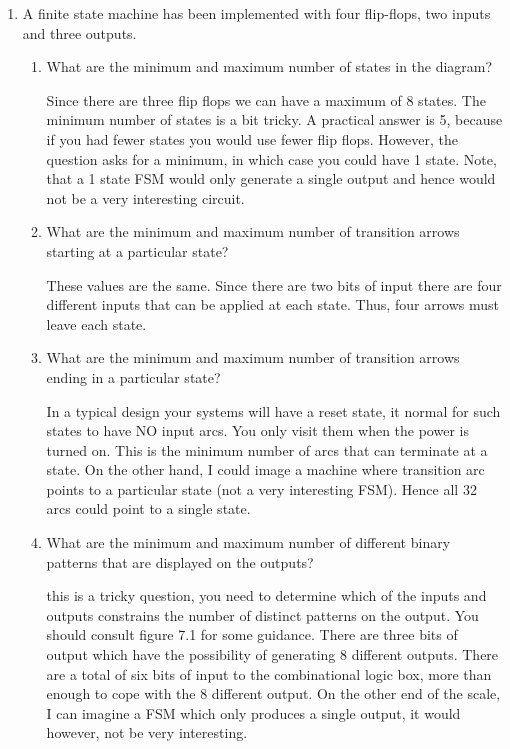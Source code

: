 \begin{enumerate}
\item A finite state machine has been implemented with four
flip-flops, two inputs and three outputs. 
	\begin{enumerate}
	\item What are the minimum and maximum number of states in the diagram?
\begin{solution}{
Since there are three flip flops we can have a maximum of 8 states.  The minimum
number of states is a bit tricky.  A practical answer is 5, because if you
had fewer states you would use fewer flip flops.  However, the question
asks for a minimum, in which case you could have 1 state.  Note, that a
1 state FSM would only generate a single output and hence would not be a
very interesting circuit.
}\end{solution}
	\item What are the minimum and maximum number of transition arrows 
		starting at a particular state?
\begin{solution}{
These values are the same.  Since there are two bits of input there are four
different inputs that can be applied at each state.  Thus, four arrows must
leave each state.
}\end{solution}
	\item What are the minimum and maximum number of transition arrows 
		ending in a particular state?
\begin{solution}{
In a typical design your systems will have a reset state, it normal for such
states to have NO input arcs.  You only visit them when the power is turned on.
This is the minimum number of arcs that can terminate at a state.  On the
other hand, I could image a machine where   transition arc points to a
particular state (not a very interesting FSM).  Hence all 32 arcs could point
to a single state.
}\end{solution}
	\item What are the minimum and maximum number of different binary patterns
		that are displayed on the outputs? 
\begin{solution}{
this is a tricky question, you need to determine which of the inputs and outputs
constrains the number of distinct patterns on the output.  You should consult
figure 7.1 for some guidance.  There are three bits of output which have the possibility
of generating 8 different outputs.  There are a total of six bits of input to the
combinational logic box, more than enough to cope with the 8 different output.  On
the other end of the scale, I can imagine a FSM which only produces a single output,
it would however, not be very interesting.
}\end{solution}
	\end{enumerate}



\end{enumerate}
